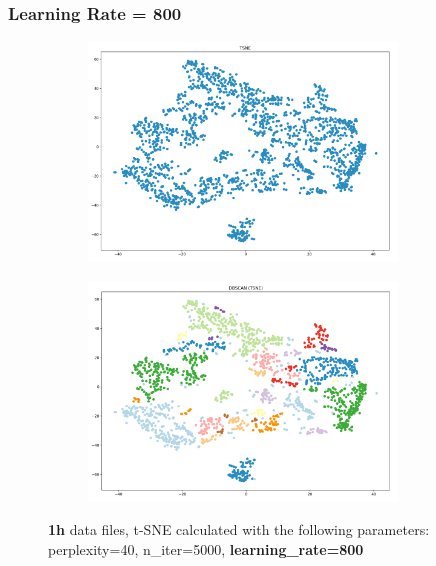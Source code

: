 \subsubsection{Learning Rate = 800}
\begin{figure}[H]
  \centering
  \begin{subfigure}{.5\textwidth}
    \centering
    \includegraphics[width=0.9\textwidth]{./images/tsneParametersTest/learningRate/lr800-1hTSNE.png}
  \end{subfigure}%
  \begin{subfigure}{.5\textwidth}
    \centering
    \includegraphics[width=0.9\textwidth]{./images/tsneParametersTest/learningRate/lr800-1hDBSCAN.png}
  \end{subfigure}
	\caption{\textbf{1h} data files, t-SNE calculated with the following parameters: perplexity=40, n\_iter=5000, \textbf{learning\_rate=800}}
	\label{figure:1hlr800TSNE}
\end{figure}

